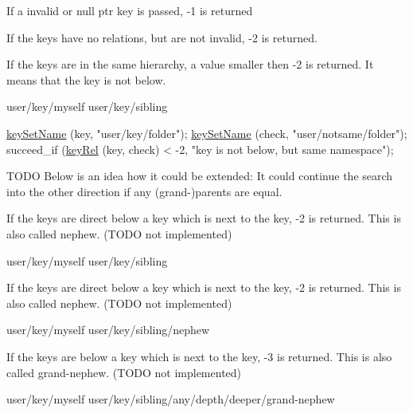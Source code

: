 \begin{DoxyItemize}
\item If a invalid or null ptr key is passed, -\/1 is returned
\item If the keys have no relations, but are not invalid, -\/2 is returned.
\item If the keys are in the same hierarchy, a value smaller then -\/2 is returned. It means that the key is not below. \begin{DoxyVerb}user/key/myself
user/key/sibling
\end{DoxyVerb}

\end{DoxyItemize}


\begin{DoxyCode}
\hyperlink{group__keyname_ga7699091610e7f3f43d2949514a4b35d9}{keySetName} (key, \textcolor{stringliteral}{"user/key/folder"});
\hyperlink{group__keyname_ga7699091610e7f3f43d2949514a4b35d9}{keySetName} (check, \textcolor{stringliteral}{"user/notsame/folder"});
succeed\_if (\hyperlink{group__keytest_ga6bb0f95ac34ce9c42d61bb35a76139d0}{keyRel} (key, check) < -2, \textcolor{stringliteral}{"key is not below, but same namespace"});
\end{DoxyCode}



\begin{DoxyCode}
\end{DoxyCode}


T\+O\+DO Below is an idea how it could be extended\+: It could continue the search into the other direction if any (grand-\/)parents are equal.


\begin{DoxyItemize}
\item If the keys are direct below a key which is next to the key, -\/2 is returned. This is also called nephew. (T\+O\+DO not implemented) \begin{DoxyVerb}user/key/myself
user/key/sibling
\end{DoxyVerb}

\item If the keys are direct below a key which is next to the key, -\/2 is returned. This is also called nephew. (T\+O\+DO not implemented) \begin{DoxyVerb}user/key/myself
user/key/sibling/nephew
\end{DoxyVerb}

\item If the keys are below a key which is next to the key, -\/3 is returned. This is also called grand-\/nephew. (T\+O\+DO not implemented) \begin{DoxyVerb}user/key/myself
user/key/sibling/any/depth/deeper/grand-nephew
\end{DoxyVerb}

\end{DoxyItemize}


